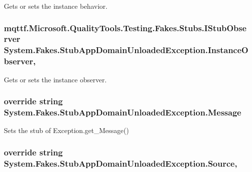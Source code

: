 Gets or sets the instance behavior.

\hypertarget{class_system_1_1_fakes_1_1_stub_app_domain_unloaded_exception_a2f48ced46889efa7960f924e4b7fd1c4}{
\subsubsection[{Instance\-Observer}]{\setlength{\rightskip}{0pt plus 5cm}mqttf.\-Microsoft.\-Quality\-Tools.\-Testing.\-Fakes.\-Stubs.\-I\-Stub\-Observer System.\-Fakes.\-Stub\-App\-Domain\-Unloaded\-Exception.\-Instance\-Observer\hspace{0.3cm}{\ttfamily [get]}, {\ttfamily [set]}}}\label{class_system_1_1_fakes_1_1_stub_app_domain_unloaded_exception_a2f48ced46889efa7960f924e4b7fd1c4}


Gets or sets the instance observer.

\hypertarget{class_system_1_1_fakes_1_1_stub_app_domain_unloaded_exception_af460b9f0bdd7e471dda20aee17000dd9}{
\subsubsection[{Message}]{\setlength{\rightskip}{0pt plus 5cm}override string System.\-Fakes.\-Stub\-App\-Domain\-Unloaded\-Exception.\-Message\hspace{0.3cm}{\ttfamily [get]}}}\label{class_system_1_1_fakes_1_1_stub_app_domain_unloaded_exception_af460b9f0bdd7e471dda20aee17000dd9}


Sets the stub of Exception.\-get\-\_\-\-Message()

\hypertarget{class_system_1_1_fakes_1_1_stub_app_domain_unloaded_exception_a92ae2598bf382599ad534db51c271c23}{
\subsubsection[{Source}]{\setlength{\rightskip}{0pt plus 5cm}override string System.\-Fakes.\-Stub\-App\-Domain\-Unloaded\-Exception.\-Source\hspace{0.3cm}{\ttfamily [get]}, {\ttfamily [set]}}}\label{class_system_1_1_fakes_1_1_stub_app_domain_unloaded_exception_a92ae2598bf382599ad534db51c271c23}


